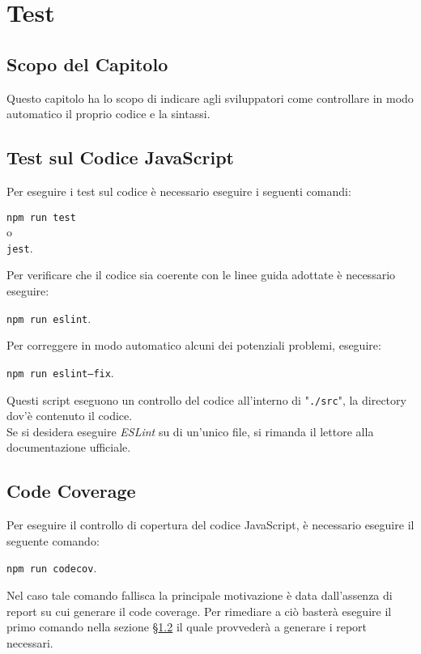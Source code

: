 \section{Test}\label{Test}

\subsection{Scopo del Capitolo}\label{Test_scopo}
Questo capitolo ha lo scopo di indicare agli sviluppatori come controllare in modo automatico il proprio codice e la sintassi.

\subsection{Test sul Codice JavaScript}\label{test_JS}
Per eseguire i test sul codice è necessario eseguire i seguenti comandi:
\begin{center}
	\texttt{npm run test}\\
	o\\
	\texttt{jest}.
\end{center}
Per verificare che il codice sia coerente con le linee guida adottate è necessario eseguire:
\begin{center}
	\texttt{npm run eslint}.
\end{center}
Per correggere in modo automatico alcuni dei potenziali problemi, eseguire:
\begin{center}
	\texttt{npm run eslint--fix}.
\end{center}
Questi script eseguono un controllo del codice all'interno di "\texttt{./src}", la directory dov'è contenuto il codice.\\
Se si desidera eseguire \textit{ESLint} su di un'unico file, si rimanda il lettore alla documentazione ufficiale.

\subsection{Code Coverage}\label{test_codecoverage}
Per eseguire il controllo di copertura del codice JavaScript, è necessario eseguire il seguente comando:
\begin{center}
	\texttt{npm run codecov}.
\end{center}
Nel caso tale comando fallisca la principale motivazione è data dall'assenza di report su cui generare il code coverage. Per rimediare a ciò basterà eseguire il primo comando nella sezione §\ref{test_JS} il quale provvederà a generare i report necessari.

